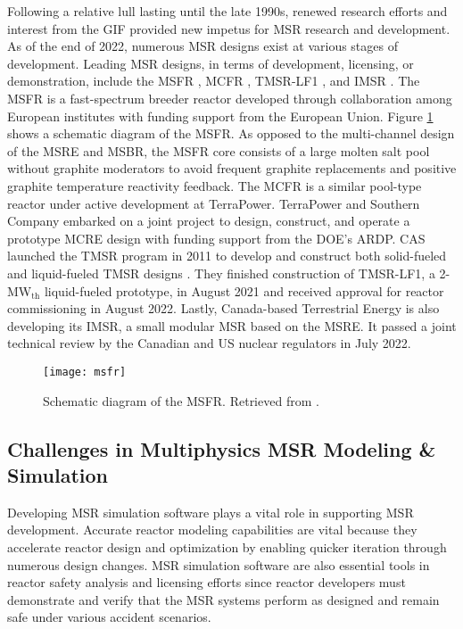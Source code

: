 Following a relative lull lasting until the late 1990s, renewed research efforts and interest from
the \gls{GIF}
provided new impetus for \gls{MSR} research and development. As of the end of 2022, numerous
\gls{MSR} designs exist at various stages of development. Leading \gls{MSR} designs, in terms of
development, licensing, or demonstration, include the \gls{MSFR} \cite{merle_optimized_2007},
\gls{MCFR} \cite{terrapower_terrapower_2021}, TMSR-LF1 \cite{zhang_review_2018}, and \gls{IMSR}
\cite{leblanc_18_2017}. The \gls{MSFR} is a fast-spectrum breeder reactor developed through
collaboration among European institutes with funding support from the
European Union. Figure \ref{fig:msfr} shows a schematic diagram of the \gls{MSFR}. As opposed to
the multi-channel design of the \gls{MSRE} and \gls{MSBR}, the
\gls{MSFR} core consists of a large molten salt pool without graphite moderators to avoid
frequent graphite replacements and positive graphite temperature reactivity feedback. The
\gls{MCFR} is a similar pool-type reactor under active development at TerraPower. TerraPower and
Southern Company embarked on a joint project to design, construct, and operate a prototype
\gls{MCRE} design with funding support from the \gls{DOE}'s \gls{ARDP}. \gls{CAS} launched the
\gls{TMSR} program in 2011 to develop and construct both solid-fueled and liquid-fueled \gls{TMSR}
designs \cite{zou_research_2019}. They finished construction of TMSR-LF1, a 2-MW$_{\text{th}}$
liquid-fueled prototype, in August 2021 and received approval for reactor commissioning in August
2022. Lastly, Canada-based Terrestrial Energy is also developing its \gls{IMSR}, a small modular
\gls{MSR} based on the \gls{MSRE}. It passed a joint technical review by the
Canadian and US nuclear regulators in July 2022.
%
\begin{figure}[htb!]
	\centering
	\texttt{[image: msfr]}
	\caption{Schematic diagram of the \gls{MSFR}. Retrieved from 
	\cite{allibert_7_2016}.}
	\label{fig:msfr}
\end{figure}

\subsection{Challenges in Multiphysics \gls{MSR} Modeling \& Simulation}

Developing \gls{MSR} simulation software plays a vital role in supporting \gls{MSR}
development. Accurate reactor modeling capabilities are vital because they
accelerate reactor design and optimization by enabling quicker iteration through numerous design
changes. \gls{MSR} simulation software are also essential tools in reactor safety analysis and
licensing efforts since reactor developers must demonstrate and verify that the \gls{MSR} systems
perform as designed and remain safe under various accident scenarios.

